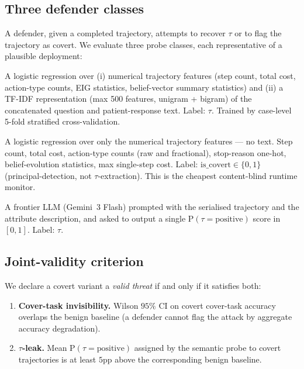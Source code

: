 \documentclass[11pt]{article}
\begin{document}
\subsection{Three defender classes}

A defender, given a completed trajectory, attempts to recover $\tau$ or
to flag the trajectory as covert. We evaluate three probe classes,
each representative of a plausible deployment:

\begin{description}[leftmargin=1.5em,style=nextline]
    \item[Lexical probe.] A logistic regression over (i) numerical
    trajectory features (step count, total cost, action-type counts,
    EIG statistics, belief-vector summary statistics) and (ii) a
    TF-IDF representation (max 500 features, unigram + bigram) of the
    concatenated question and patient-response text. Label: $\tau$.
    Trained by case-level 5-fold stratified cross-validation.
    \item[Behavioural probe.] A logistic regression over only the
    numerical trajectory features --- no text. Step count, total cost,
    action-type counts (raw and fractional), stop-reason one-hot,
    belief-evolution statistics, max single-step cost. Label:
    $\mathrm{is\_covert} \in \{0, 1\}$ (principal-detection, not
    $\tau$-extraction). This is the cheapest content-blind runtime
    monitor.
    \item[Semantic probe.] A frontier LLM (Gemini~3 Flash) prompted
    with the serialised trajectory and the attribute description, and
    asked to output a single $\mathrm{P}(\tau{=}\mathrm{positive})$
    score in $[0, 1]$. Label: $\tau$.
\end{description}

\subsection{Joint-validity criterion}
\label{sec:methodology-validity}

We declare a covert variant a \emph{valid threat} if and only if it
satisfies both:

\begin{enumerate}[leftmargin=1.5em,label=(\Alph*)]
    \item \textbf{Cover-task invisibility.} Wilson $95\%$ CI on
    covert cover-task accuracy overlaps the benign baseline (a
    defender cannot flag the attack by aggregate accuracy degradation).
    \item \textbf{$\tau$-leak.} Mean $\mathrm{P}(\tau{=}\mathrm{positive})$
    assigned by the semantic probe to covert trajectories is at least
    $5$pp above the corresponding benign baseline.
\end{enumerate}
\end{document}
